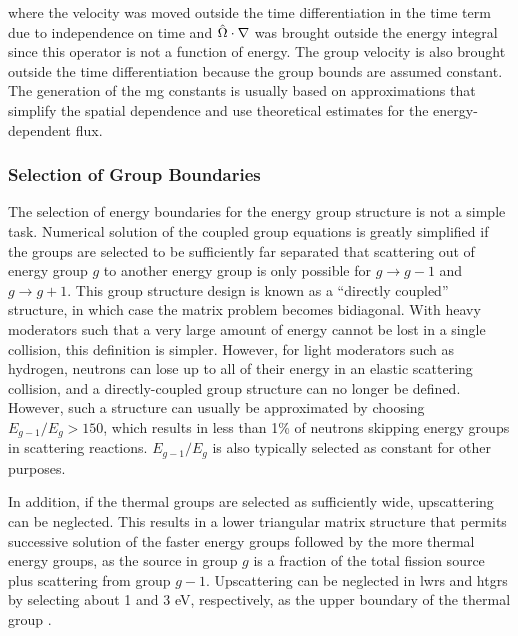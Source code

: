 where the velocity was moved outside the time differentiation in the time term due to independence on time and \(\hat{\Omega}\cdot\nabla\) was brought outside the energy integral since this operator is not a function of energy. The group velocity is also brought outside the time differentiation because the group bounds are assumed constant. The generation of the \gls{mg} constants is usually based on approximations that simplify the spatial dependence and use theoretical estimates for the energy-dependent flux.

\subsubsection{Selection of Group Boundaries}

The selection of energy boundaries for the energy group structure is not a simple task. Numerical solution of the coupled group equations is greatly simplified if the groups are selected to be sufficiently far separated that scattering out of energy group \(g\) to another energy group is only possible for \(g\rightarrow g-1\) and \(g\rightarrow g+1\). This group structure design is known as a ``directly coupled'' structure, in which case the matrix problem becomes bidiagonal. With heavy moderators such that a very large amount of energy cannot be lost in a single collision, this definition is simpler. However, for light moderators such as hydrogen, neutrons can lose up to all of their energy in an elastic scattering collision, and a directly-coupled group structure can no longer be defined. However, such a structure can usually be approximated by choosing \(E_{g-1}/E_g>150\), which results in less than 1\% of neutrons skipping energy groups in scattering reactions. \(E_{g-1}/E_g\) is also typically selected as constant for other purposes.

In addition, if the thermal groups are selected as sufficiently wide, upscattering can be neglected. This results in a lower triangular matrix structure that permits successive solution of the faster energy groups followed by the more thermal energy groups, as the source in group \(g\) is a fraction of the total fission source plus scattering from group \(g-1\). Upscattering can be neglected in \glspl{lwr} and \glspl{htgr} by selecting about 1 and 3 eV, respectively, as the upper boundary of the thermal group \cite{duderstadt}.